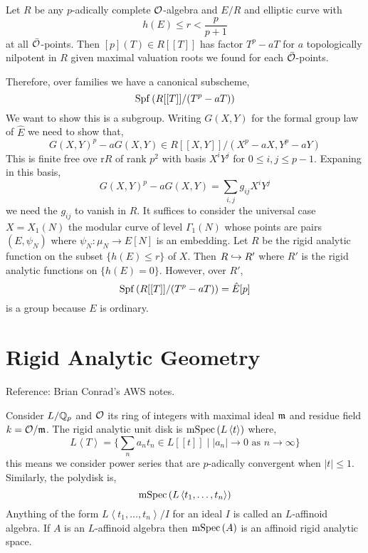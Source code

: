 \documentclass[12pt]{article}
\begin{document}
\begin{thm}[Katz]
Let $R$ be any $p$-adically complete $\mathcal{O}$-algebra and $E / R$ and elliptic curve with 
\[ h(E) \le r < \frac{p}{p+1} \]
at all $\bar{\mathcal{O}}$-points. Then $[p](T) \in R[[T]]$ has factor $T^p - a T$ for $a$ topologically nilpotent in $R$ given maximal valuation roots we found for each $\bar{\mathcal{O}}$-points. 
\end{thm}

\begin{rmk}
Therefore, over families we have a canonical subscheme,
\[ \mathrm{Spf}\left( R[[T]]/(T^p - a T) \right) \]
We want to show this is a subgroup. Writing $G(X,Y)$ for the formal group law of $\hat{E}$ we need to show that,
\[ G(X,Y)^p - a G(X, Y) \in R[[X,Y]]/(X^p - a X, Y^p - a Y) \]
This is finite free ove r$R$ of rank $p^2$ with basis $X^i Y^j$ for $0 \le i,j \le p-1$. Expaning in this basis,
\[ G(X,Y)^p - a G(X,Y) = \sum_{i,j} g_{ij} X^i Y^j \]
we need the $g_{ij}$ to vanish in $R$. It suffices to consider the universal case $X = X_1(N)$ the modular curve of level $\Gamma_1(N)$ whose points are pairs $(E, \psi_N)$ where $\psi_N : \mu_N \to E[N]$ is an embedding. Let $R$ be the rigid analytic function on the subset $\{ h(E) \le r \}$ of $X$. Then $R \hookrightarrow R'$ where $R'$ is the rigid analytic functions on $\{ h(E) = 0 \}$. However, over $R'$,
\[ \mathrm{Spf}\left( R[[T]]/(T^p - a T) \right) = \hat{E}[p] \]
is a group because $E$ is ordinary.
\end{rmk}

\section{Rigid Analytic Geometry}

\begin{rmk}
Reference: Brian Conrad's AWS notes.
\end{rmk}

Consider $L / \mathbb{Q}_p$ and $\mathcal{O}$ its ring of integers with maximal ideal $\mathfrak{m}$ and residue field $k = \mathcal{O} / \mathfrak{m}$. The rigid analytic unit disk is $\mathrm{mSpec}\left( L\left< t \right> \right)$ where,
\[ L \left< T \right> = \{ \sum_n a_n t_n \in L[[t]] \mid | a_n | \to 0 \text{ as } n \to \infty \} \]
this means we consider power series that are $p$-adically convergent when $|t| \le 1$. Similarly, the polydisk is,
\[ \mathrm{mSpec}\left( L \left< t_1, \dots, t_n \right> \right) \]
Anything of the form $L \left< t_1, \dots, t_n \right> / I$ for an ideal $I$ is called an $L$-affinoid algebra. 
If $A$ is an $L$-affinoid algebra then $\mathrm{mSpec}\left( A \right)$ is an affinoid rigid analytic space. 
\end{document}
